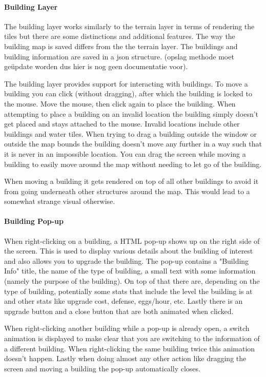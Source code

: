 \documentclass[12pt]{article}
\begin{document}
\paragraph{Building Layer} The building layer works similarly to the terrain layer in terms of rendering the tiles but
there are some distinctions and  additional features. The way the building map is saved differs from the the terrain
layer. The buildings and building information are saved in a json structure. (opslag methode moet geüpdate worden dus
hier is nog geen documentatie voor).

The building layer provides support for interacting with buildings. To move a building you can click (without dragging),
after which the building is locked to the mouse. Move the mouse, then click again to place the building. When attempting
to place a building on an invalid location the building simply doesn't get placed and stays attached to the mouse.
Invalid locations include other buildings and water tiles. When trying to drag a building outside the window or outside
the map bounds the building doesn't move any further in a way such that it is never in an impossible location. You can
drag the screen while moving a building to easily move around the map without needing to let go of the building.

When moving a building it gets rendered on top of all other buildings to avoid it from going underneath other structures
around the map. This would lead to a somewhat strange visual otherwise.

\paragraph{Building Pop-up} When right-clicking on a building, a HTML pop-up shows up on the right side of the screen.
This is used to display various details about the building of interest and also allows you to upgrade the building. The
pop-up contains a "Building Info" title, the name of the type of building, a small text with some information (namely
the purpose of the building). On top of that there are, depending on the type of building, potentially some stats that
include the level the building is at and other stats like upgrade cost, defense, eggs/hour, etc. Lastly there is an
upgrade button and a close button that are both animated when clicked.

When right-clicking another building while a pop-up is already open, a switch animation is displayed to make clear that
you are switching to the information of a different building. When right-clicking the same building twice this animation
doesn't happen. Lastly when doing almost any other action like dragging the screen and moving a building the pop-up
automatically closes.
\end{document}
